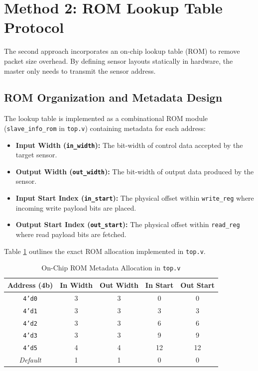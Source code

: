 \documentclass[conference]{IEEEtran}
\begin{document}
\section{Method 2: ROM Lookup Table Protocol}
The second approach incorporates an on-chip lookup table (ROM) to remove packet size overhead. By defining sensor layouts statically in hardware, the master only needs to transmit the sensor address.

\subsection{ROM Organization and Metadata Design}
The lookup table is implemented as a combinational ROM module (\texttt{slave\_info\_rom} in \texttt{top.v}) containing metadata for each address:
\begin{itemize}
    \item \textbf{Input Width (\texttt{in\_width}):} The bit-width of control data accepted by the target sensor.
    \item \textbf{Output Width (\texttt{out\_width}):} The bit-width of output data produced by the sensor.
    \item \textbf{Input Start Index (\texttt{in\_start}):} The physical offset within \texttt{write\_reg} where incoming write payload bits are placed.
    \item \textbf{Output Start Index (\texttt{out\_start}):} The physical offset within \texttt{read\_reg} where read payload bits are fetched.
\end{itemize}

Table \ref{tab:rom_map} outlines the exact ROM allocation implemented in \texttt{top.v}.

\begin{table}[htbp]
\caption{On-Chip ROM Metadata Allocation in \texttt{top.v}}
\label{tab:rom_map}
\centering
\begin{tabular}{ccccc}
\toprule
\textbf{Address (4b)} & \textbf{In Width} & \textbf{Out Width} & \textbf{In Start} & \textbf{Out Start} \\
\midrule
\texttt{4'd0} & 3 & 3 & 0 & 0 \\
\texttt{4'd1} & 3 & 3 & 3 & 3 \\
\texttt{4'd2} & 3 & 3 & 6 & 6 \\
\texttt{4'd3} & 3 & 3 & 9 & 9 \\
\texttt{4'd5} & 4 & 4 & 12 & 12 \\
\textit{Default} & 1 & 1 & 0 & 0 \\
\bottomrule
\end{tabular}
\end{table}
\end{document}
